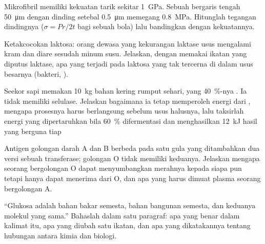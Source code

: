 \begin{exercise}[$\star\star$]\label{exo:b1:carbohydrates:8}
Mikrofibril  memiliki kekuatan tarik sekitar \qty{1}{GPa}.
Sebuah  bergaris tengah \qty{50}{\micro m} dengan dinding setebal
\qty{0.5}{\micro m} memegang  \qty{0.8}{MPa}. Hitunglah tegangan
dindingnya ($\sigma = Pr/2t$ bagi sebuah bola) lalu bandingkan dengan
kekuatannya.
\end{exercise}

\begin{exercise}[$\star\star$]\label{exo:b1:carbohydrates:9}
Ketakcocokan laktosa: orang dewasa yang kekurangan laktase usus
mengalami kram dan diare sesudah minum susu. Jelaskan, dengan memakai
ikatan yang diputus laktase, apa yang terjadi pada laktosa yang tak
tercerna di dalam usus besarnya (bakteri, ).
\end{exercise}

\begin{exercise}[$\star\star\star$]\label{exo:b1:carbohydrates:10}
Seekor sapi memakan \qty{10}{kg} bahan kering rumput sehari, yang
\qty{40}{\%}-nya . Ia tidak memiliki selulase. Jelaskan
bagaimana ia tetap memperoleh energi dari , mengapa
prosesnya harus berlangsung sebelum usus halusnya, lalu taksirlah
energi yang dipertaruhkan bila \qty{60}{\%}  difermentasi
dan menghasilkan \qty{12}{kJ} hasil yang berguna tiap
\end{exercise}

\begin{exercise}[$\star\star\star$]\label{exo:b1:carbohydrates:11}
Antigen golongan darah A dan B berbeda pada satu gula yang ditambahkan
dua versi sebuah transferase; golongan O tidak memiliki keduanya.
Jelaskan mengapa seorang bergolongan O dapat menyumbangkan  merahnya
kepada siapa pun tetapi hanya dapat menerima dari O, dan apa yang harus
dimuat plasma seorang bergolongan A.
\end{exercise}

\begin{exercise}[$\star\star\star$]\label{exo:b1:carbohydrates:12}
``Glukosa adalah bahan bakar semesta,  bahan bangunan semesta,
dan keduanya molekul yang sama.'' Bahaslah dalam satu paragraf: apa
yang benar dalam kalimat itu, apa yang diubah satu ikatan, dan apa yang
dikatakannya tentang hubungan antara kimia dan biologi.
\end{exercise}

